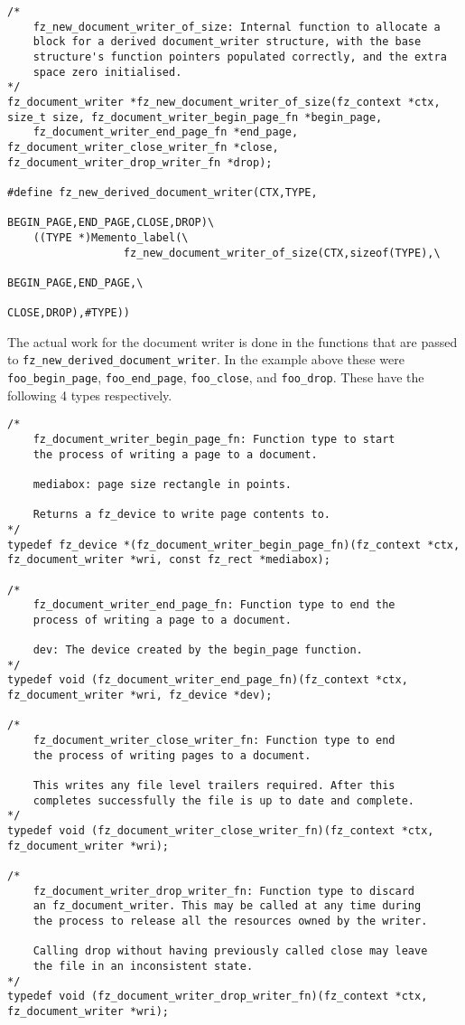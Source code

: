 \documentclass[oneside]{book}
\begin{document}
\begin{lstlisting}
/*
	fz_new_document_writer_of_size: Internal function to allocate a
	block for a derived document_writer structure, with the base
	structure's function pointers populated correctly, and the extra
	space zero initialised.
*/
fz_document_writer *fz_new_document_writer_of_size(fz_context *ctx, size_t size, fz_document_writer_begin_page_fn *begin_page,
	fz_document_writer_end_page_fn *end_page, fz_document_writer_close_writer_fn *close, fz_document_writer_drop_writer_fn *drop);

#define fz_new_derived_document_writer(CTX,TYPE,
                                           BEGIN_PAGE,END_PAGE,CLOSE,DROP)\
	((TYPE *)Memento_label(\
	              fz_new_document_writer_of_size(CTX,sizeof(TYPE),\
													BEGIN_PAGE,END_PAGE,\
													CLOSE,DROP),#TYPE))
\end{lstlisting}

The actual work for the document writer is done in the functions that are passed to \texttt{fz\_new\_derived\_document\_writer}. In the example above these were \texttt{foo\_begin\_page}, \texttt{foo\_end\_page}, \texttt{foo\_close}, and \texttt{foo\_drop}. These have the following 4 types respectively. 

\begin{lstlisting}
/*
	fz_document_writer_begin_page_fn: Function type to start
	the process of writing a page to a document.

	mediabox: page size rectangle in points.

	Returns a fz_device to write page contents to.
*/
typedef fz_device *(fz_document_writer_begin_page_fn)(fz_context *ctx, fz_document_writer *wri, const fz_rect *mediabox);

/*
	fz_document_writer_end_page_fn: Function type to end the
	process of writing a page to a document.

	dev: The device created by the begin_page function.
*/
typedef void (fz_document_writer_end_page_fn)(fz_context *ctx, fz_document_writer *wri, fz_device *dev);

/*
	fz_document_writer_close_writer_fn: Function type to end
	the process of writing pages to a document.

	This writes any file level trailers required. After this
	completes successfully the file is up to date and complete.
*/
typedef void (fz_document_writer_close_writer_fn)(fz_context *ctx, fz_document_writer *wri);

/*
	fz_document_writer_drop_writer_fn: Function type to discard
	an fz_document_writer. This may be called at any time during
	the process to release all the resources owned by the writer.

	Calling drop without having previously called close may leave
	the file in an inconsistent state.
*/
typedef void (fz_document_writer_drop_writer_fn)(fz_context *ctx, fz_document_writer *wri);
\end{lstlisting}
\end{document}
